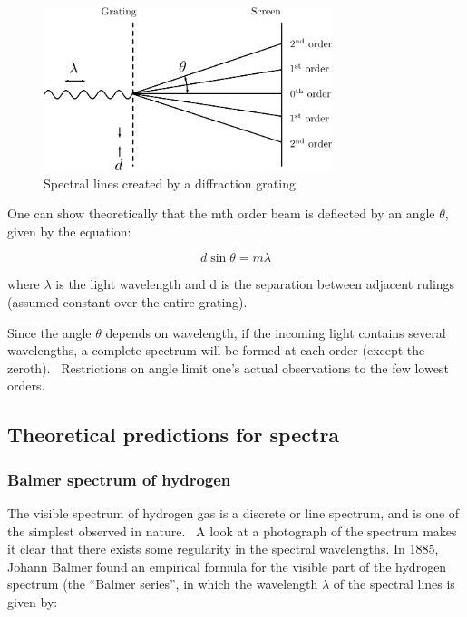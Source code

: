 \documentclass{article}
\begin{document}
\begin{figure}
\begin{centering}
\includegraphics[width=0.75\textwidth]{images/grating-schematic.png} 
\caption{Spectral lines created by a diffraction grating}
\label{fig:grating}
\end{centering}
\end{figure}

One can show theoretically that the mth order beam is deflected by an
angle ${\theta}$, given by the equation: 

\begin{equation}
d \sin \theta = m \lambda
\label{eq:gratingmaxima}
\end{equation}

where ${\lambda}$ is the light wavelength and d is the separation
between adjacent rulings (assumed constant over the entire grating). 


Since the angle ${\theta}$ depends on wavelength, if the incoming light
contains several wavelengths, a complete spectrum will be formed at
each order (except the zeroth). \ Restrictions on angle limit
one's actual observations to the few lowest orders.

\subsection{Theoretical predictions for spectra}
\subsubsection{Balmer spectrum of hydrogen}

The visible spectrum of hydrogen gas is a discrete or line spectrum, and
is one of the simplest observed in nature. \ A look at a photograph of
the spectrum makes it clear that there exists some regularity in the
spectral wavelengths. In 1885, Johann Balmer found an empirical formula
for the visible part of the hydrogen spectrum (the
``Balmer series'', in which the wavelength
${\lambda}$ of the spectral lines is given by:
\end{document}
